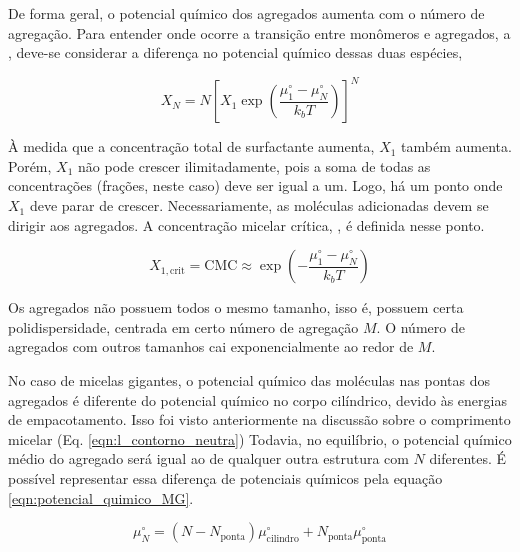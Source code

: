 		De forma geral, o potencial químico dos agregados aumenta com o número de agregação. Para entender onde ocorre a transição entre monômeros e agregados, a \cmc, deve-se considerar a diferença no potencial químico dessas duas espécies,
		
		\begin{equation}
			X_N = N \left[ X_1 \exp \left(\dfrac{\mu_1^\circ - \mu_N^\circ}{k_b T}\right) \right] ^ N
			\label{eqn:termodinamica_diferenca_potencial_tamanho}
		\end{equation}
		
		À medida que a concentração total de surfactante aumenta, \(X_1\) também aumenta. Porém, \(X_1\) não pode crescer ilimitadamente, pois a soma de todas as concentrações (frações, neste caso) deve ser igual a um. Logo, há um ponto onde \(X_1\) deve parar de crescer. Necessariamente, as moléculas adicionadas devem se dirigir aos agregados. A concentração micelar crítica, \cmc, é definida nesse ponto.
		
		\begin{equation}
			X_{1, \mathrm{crit}} = \mathrm{CMC} \approx \exp \left(  - \dfrac{\mu_1^\circ - \mu_N^\circ}{k_b T} \right)
			\label{eqn:cmc_termodinamica}
		\end{equation}  %
		
		Os agregados não possuem todos o mesmo tamanho, isso é, possuem certa polidispersidade, centrada em certo número de agregação \(M\). O número de agregados com outros tamanhos cai exponencialmente ao redor de \(M\).
		
		No caso de micelas gigantes, o potencial químico das moléculas nas pontas dos agregados é diferente do potencial químico no corpo cilíndrico, devido às energias de empacotamento. Isso foi visto anteriormente na discussão sobre o comprimento micelar (Eq. \ref{eqn:l_contorno_neutra}) Todavia, no equilíbrio, o potencial químico médio do agregado será igual ao de qualquer outra estrutura com \(N\) diferentes. É possível representar essa diferença de potenciais químicos pela equação \ref{eqn:potencial_quimico_MG}.
		
		\begin{equation}
			\mu_N^\circ = \left( N - N_\mathrm{ponta} \right) \mu_\mathrm{cilindro}^\circ + N_\mathrm{ponta}\mu_\mathrm{ponta}^\circ
			\label{eqn:potencial_quimico_MG}
		\end{equation} %
		
%		
		
